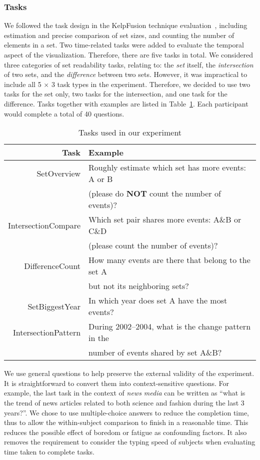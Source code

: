 \subsubsection{Tasks} We followed the task design in the KelpFusion technique evaluation~\cite{Meulemans2013}, including estimation and precise comparison of set sizes, and counting the number of elements in a set. Two time-related tasks were added to evaluate the temporal aspect of the  visualization. Therefore, there are five tasks in total. We considered three categories of set readability tasks, relating to: the \textit{set} itself, the \textit{intersection} of two sets, and the \textit{difference} between two sets. However, it was impractical to include all 5 $\times$ 3 task types in the experiment. Therefore, we decided to use two tasks for the set only, two tasks for the intersection, and one task for the difference. Tasks together with examples are listed in Table~\ref{table:tasks}. Each participant would complete a total of 40 questions.

\begin{table}[ht]
\centering
\caption{Tasks used in our experiment}
\label{table:tasks}
\begin{tabular}{rl}
	\toprule
	Task & Example \\ 
	\midrule
	SetOverview & Roughly estimate which set has more events:  A or B \\&(please do \textbf{NOT} count the number of events)? \\		
 	IntersectionCompare & Which set pair shares more events: A\&B or C\&D\\&  (please count the number of events)? \\ 
 	DifferenceCount & How many events are there that belong to the set A \\&but not its neighboring sets? \\ 
 	SetBiggestYear & In which year does set A have the most events? \\ 
 	IntersectionPattern & During 2002--2004, what is the change pattern in the \\& number of  events shared by set A\&B?\\
	\bottomrule
\end{tabular} 
\end{table}


We use general questions to help preserve the external validity of the experiment. It is straightforward to convert them into context-sensitive questions. For example, the last task in the context of \textit{news media} can be written as ``what is the trend of news articles related to both science and fashion during the last 3 years?''. We chose to use multiple-choice answers to reduce the completion time, thus to allow the within-subject comparison to finish in a reasonable time. This reduces the possible effect of boredom or fatigue as confounding factors. It also removes the requirement to consider the typing speed of subjects when evaluating time taken to complete tasks.

